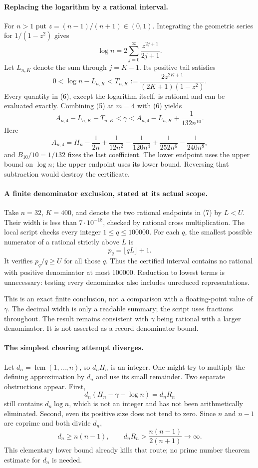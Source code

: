 \documentclass[11pt]{article}
\begin{document}
\paragraph{Replacing the logarithm by a rational interval.}
For $n>1$ put $z=(n-1)/(n+1)\in(0,1)$. Integrating the geometric
series for $1/(1-z^2)$ gives
\[
 \log n=2\sum_{j=0}^{\infty}\frac{z^{2j+1}}{2j+1}.
\]
Let $L_{n,K}$ denote the sum through $j=K-1$. Its positive tail satisfies
\[
 0<\log n-L_{n,K}
      <T_{n,K}:=\frac{2z^{2K+1}}{(2K+1)(1-z^2)}.        \tag{6}
\]
Every quantity in (6), except the logarithm itself, is rational and can
be evaluated exactly. Combining (5) at $m=4$ with (6) yields
\[
 A_{n,4}-L_{n,K}-T_{n,K}<\gamma
             <A_{n,4}-L_{n,K}+\frac1{132n^{10}}.         \tag{7}
\]
Here
\[
 A_{n,4}=H_n-\frac1{2n}+\frac1{12n^2}-\frac1{120n^4}
                         +\frac1{252n^6}-\frac1{240n^8},
\]
and $B_{10}/10=1/132$ fixes the last coefficient.
The lower endpoint uses the upper bound on $\log n$; the upper
endpoint uses its lower bound. Reversing that subtraction would destroy
the certificate.

\paragraph{A finite denominator exclusion, stated at its actual scope.}
Take $n=32$, $K=400$, and denote the two rational endpoints in (7) by
$L<U$. Their width is less than $7\cdot10^{-18}$, checked by rational
cross multiplication. The local script checks every integer
$1\le q\le100000$. For each $q$, the smallest possible numerator of a
rational strictly above $L$ is
\[
                              p_q=\lfloor qL\rfloor+1.
\]
It verifies $p_q/q\ge U$ for all those $q$. Thus the certified interval
contains no rational with positive denominator at most $100000$.
Reduction to lowest terms is unnecessary: testing every denominator
also includes unreduced representations.

This is an exact finite conclusion, not a comparison with a
floating-point value of $\gamma$. The decimal width is only a readable
summary; the script uses fractions throughout. The result remains
consistent with $\gamma$ being rational with a larger denominator.
It is not asserted as a record denominator bound.

\paragraph{The simplest clearing attempt diverges.}
Let $d_n=\operatorname{lcm}(1,\ldots,n)$, so $d_nH_n$ is an integer.
One might try to multiply the defining approximation by $d_n$ and use
its small remainder. Two separate obstructions appear.
First,
\[
                 d_n(H_n-\gamma-\log n)=d_nR_n
\]
still contains $d_n\log n$, which is not an integer and has not been
arithmetically eliminated. Second, even its positive size does not
tend to zero. Since $n$ and $n-1$ are coprime and both divide $d_n$,
\[
 d_n\ge n(n-1),\qquad
 d_nR_n>\frac{n(n-1)}{2(n+1)}\longrightarrow\infty.      \tag{8}
\]
This elementary lower bound already kills that route; no prime number
theorem estimate for $d_n$ is needed.
\end{document}
